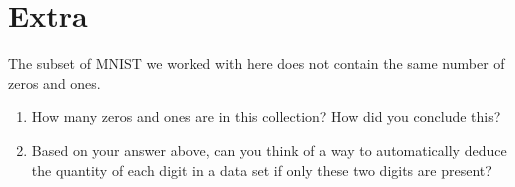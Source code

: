 \documentclass[11pt,noanswers,addpoints]{exam}
\begin{document}
\section{Extra}

The subset of MNIST we worked with here does not contain the same number of zeros and ones.
\begin{enumerate}
\item How many zeros and ones are in this collection? How did you conclude this?
\item Based on your answer above, can you think of a way to automatically deduce the quantity of
each digit in a data set if only these two digits are present?
\end{enumerate}
\end{document}
